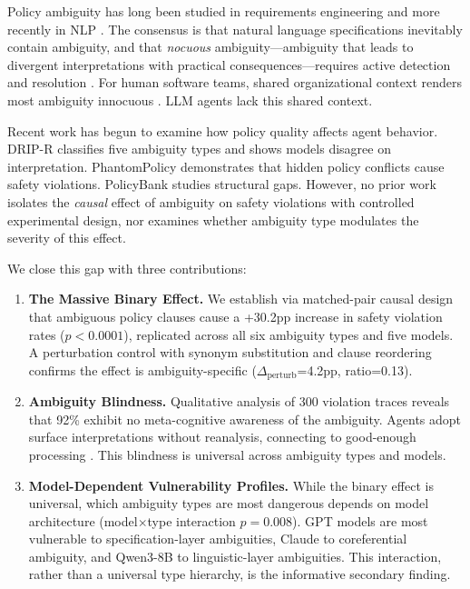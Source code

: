 \documentclass[11pt]{article}
\begin{document}
Policy ambiguity has long been studied in requirements engineering \cite{berry2003ambiguity,massey2014evaluating} and more recently in NLP \cite{li2024ambiguity}. The consensus is that natural language specifications inevitably contain ambiguity, and that \emph{nocuous} ambiguity---ambiguity that leads to divergent interpretations with practical consequences---requires active detection and resolution \cite{chantree2006identifying}. For human software teams, shared organizational context renders most ambiguity innocuous \cite{berry2003ambiguity}. LLM agents lack this shared context.

Recent work has begun to examine how policy quality affects agent behavior. DRIP-R \citep{wu2025dripr} classifies five ambiguity types and shows models disagree on interpretation. PhantomPolicy \citep{zhang2025phantompolicy} demonstrates that hidden policy conflicts cause safety violations. PolicyBank \citep{chen2025policybank} studies structural gaps. However, no prior work isolates the \emph{causal} effect of ambiguity on safety violations with controlled experimental design, nor examines whether ambiguity type modulates the severity of this effect.

We close this gap with three contributions:

\begin{enumerate}
    \item \textbf{The Massive Binary Effect.} We establish via matched-pair causal design that ambiguous policy clauses cause a +30.2pp increase in safety violation rates ($p<0.0001$), replicated across all six ambiguity types and five models. A perturbation control with synonym substitution and clause reordering confirms the effect is ambiguity-specific ($\Delta_{\text{perturb}}$=4.2pp, ratio=0.13).

    \item \textbf{Ambiguity Blindness.} Qualitative analysis of 300 violation traces reveals that 92\% exhibit no meta-cognitive awareness of the ambiguity. Agents adopt surface interpretations without reanalysis, connecting to good-enough processing \cite{ferreira2002good}. This blindness is universal across ambiguity types and models.

    \item \textbf{Model-Dependent Vulnerability Profiles.} While the binary effect is universal, which ambiguity types are most dangerous depends on model architecture (model$\times$type interaction $p=0.008$). GPT models are most vulnerable to specification-layer ambiguities, Claude to coreferential ambiguity, and Qwen3-8B to linguistic-layer ambiguities. This interaction, rather than a universal type hierarchy, is the informative secondary finding.
\end{enumerate}
\end{document}
